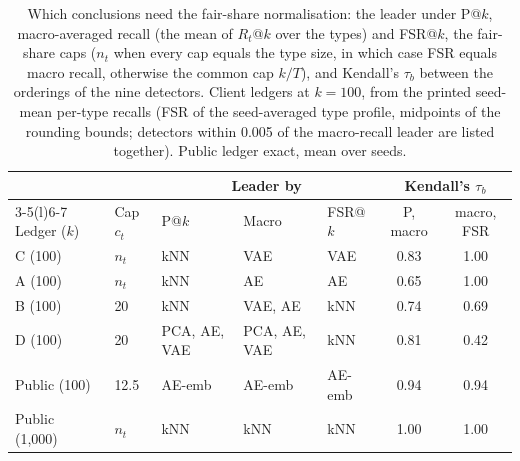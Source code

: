 \begin{table}[tbp]
\caption{Which conclusions need the fair-share normalisation: the leader under P@$k$, macro-averaged recall (the mean of $R_t$@$k$ over the types) and FSR@$k$, the fair-share caps ($n_t$ when every cap equals the type size, in which case FSR equals macro recall, otherwise the common cap $k/T$), and Kendall's $\tau_b$ between the orderings of the nine detectors. Client ledgers at $k=100$, from the printed seed-mean per-type recalls (FSR of the seed-averaged type profile, midpoints of the rounding bounds; detectors within 0.005 of the macro-recall leader are listed together). Public ledger exact, mean over seeds.}
\label{tab:macro}
\centering
\footnotesize
\setlength{\tabcolsep}{2.8pt}
\begin{tabular}{@{}lllllcc@{}}
\toprule
 & & \multicolumn{3}{c}{Leader by} & \multicolumn{2}{c}{Kendall's $\tau_b$} \\
\cmidrule(lr){3-5}\cmidrule(l){6-7}
Ledger ($k$) & Cap $c_t$ & P@$k$ & Macro & FSR@$k$ & P, macro & macro, FSR \\
\midrule
C (100) & $n_t$ & kNN & VAE & VAE & 0.83 & 1.00 \\
A (100) & $n_t$ & kNN & AE & AE & 0.65 & 1.00 \\
B (100) & 20 & kNN & VAE, AE & kNN & 0.74 & 0.69 \\
D (100) & 20 & PCA, AE, VAE & PCA, AE, VAE & kNN & 0.81 & 0.42 \\
Public (100) & 12.5 & AE-emb & AE-emb & AE-emb & 0.94 & 0.94 \\
Public (1,000) & $n_t$ & kNN & kNN & kNN & 1.00 & 1.00 \\
\bottomrule
\end{tabular}
\end{table}
